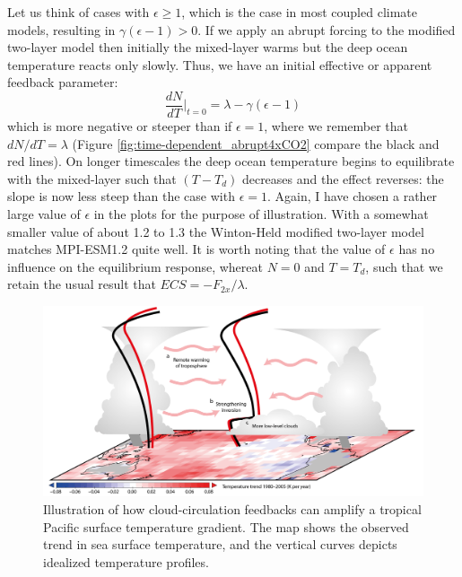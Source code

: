 \documentclass[12pt]{book}
\begin{document}
Let us think of cases with $\epsilon \ge 1$,  which is the case in most coupled climate models, resulting in $\gamma(\epsilon-1) > 0$. If we apply an abrupt forcing to the modified two-layer model then initially the mixed-layer warms but the deep ocean temperature reacts only slowly. Thus, we have an initial effective or apparent feedback parameter:
$$\frac{dN}{dT}\Bigr|_{t=0} = \lambda - \gamma(\epsilon-1)$$
which is more negative or steeper than if $\epsilon=1$, where we remember that $dN/dT=\lambda$ (Figure \ref{fig:time-dependent_abrupt4xCO2} compare the black and red lines). On longer timescales the deep ocean temperature begins to equilibrate with the mixed-layer such that $(T-T_d)$ decreases and the effect reverses: the slope is now less steep than the case with $\epsilon=1$.  Again, I have chosen a rather large value of $\epsilon$ in the plots for the purpose of illustration. With a somewhat smaller value of about 1.2 to 1.3 the Winton-Held modified two-layer model matches MPI-ESM1.2 quite well. 
It is worth noting that the value of $\epsilon$ has no influence on the equilibrium response, whereat $N=0$ and $T=T_d$, such that we retain the usual result that $ECS = -F_{2x}/\lambda$.

\begin{figure}
\begin{center}
\includegraphics[width=14 cm]{../illustrations/Mauritsen_2016_tropical_pacific}
\end{center}
\caption{ Illustration of how cloud-circulation feedbacks can amplify a tropical Pacific surface temperature gradient. The map shows the observed trend in sea surface temperature, and the vertical curves depicts idealized temperature profiles. } 
\label{fig:pacific}
\end{figure}
\end{document}
